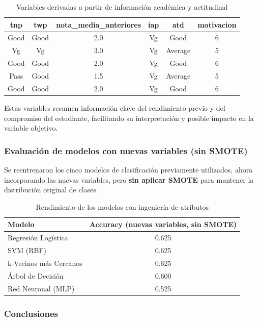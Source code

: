 \documentclass[11pt,a4paper]{article}
\begin{document}
\begin{table}[H]
\centering
\begin{tabular}{cccccc}
\toprule
\textbf{tnp} & \textbf{twp} & \textbf{nota\_media\_anteriores} & \textbf{iap} & \textbf{atd} & \textbf{motivacion} \\
\midrule
Good & Good & 2.0 & Vg & Good & 6 \\
Vg & Vg & 3.0 & Vg & Average & 5 \\
Good & Good & 2.0 & Vg & Good & 6 \\
Pass & Good & 1.5 & Vg & Average & 5 \\
Good & Good & 2.0 & Vg & Good & 6 \\
\bottomrule
\end{tabular}
\caption{Variables derivadas a partir de información académica y actitudinal}
\end{table}

Estas variables resumen información clave del rendimiento previo y del compromiso del estudiante, facilitando su interpretación y posible impacto en la variable objetivo.

\subsubsection*{Evaluación de modelos con nuevas variables (sin SMOTE)}

Se reentrenaron los cinco modelos de clasificación previamente utilizados, ahora incorporando las nuevas variables, pero \textbf{sin aplicar SMOTE} para mantener la distribución original de clases.

\begin{table}[H]
\centering
\begin{tabular}{lc}
\toprule
\textbf{Modelo} & \textbf{Accuracy (nuevas variables, sin SMOTE)} \\
\midrule
Regresión Logística & 0.625 \\
SVM (RBF) & 0.625 \\
k-Vecinos más Cercanos & 0.625 \\
Árbol de Decisión & 0.600 \\
Red Neuronal (MLP) & 0.525 \\
\bottomrule
\end{tabular}
\caption{Rendimiento de los modelos con ingeniería de atributos}
\end{table}

\subsubsection*{Conclusiones}
\end{document}

